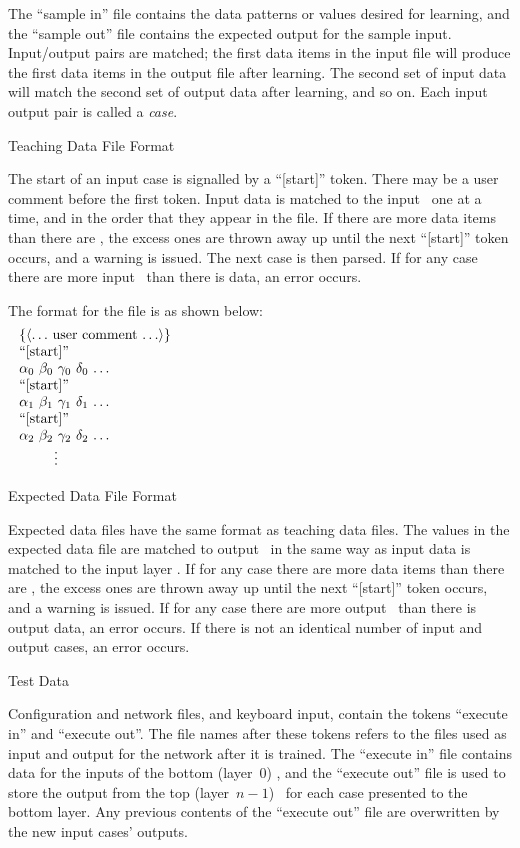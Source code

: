 The ``sample in'' file contains the data patterns or values desired
for learning, and the ``sample out'' file contains the expected
output for the sample input.
Input/output pairs are matched; the first data items in the input
file will produce the first data items in the output file after
learning.
The second set of input data will match the second set
of output data after learning, and so on.
Each input output pair is called a {\sl case}.

\sssec Teaching Data File Format

The start of an input case is signalled by a ``[start]'' token.
There may be a user comment before the first token.
Input data is matched to the input \neus\ one at a time, and in the
order that they appear in the file.
If there are more data items than there are \neus, the excess ones
are thrown away up until the next ``[start]'' token occurs, and a
warning is issued.
The next case is then parsed.
If for any case there are more input \neus\ than there is data, an
error occurs.

The format for the file is as shown below:
$$\vbox{
\halign{\hfil#\hfil&&\ \hfil#\hfil\cr
	\noalign{\noindent$\{\langle\ldots$ user comment $\ldots\rangle\}$}
	\noalign{\noindent``[start]''}
	$\alpha_0$&$\beta_0$&$\gamma_0$&$\delta_0$&$\ldots$\cr
	\noalign{\noindent``[start]''}
	$\alpha_1$&$\beta_1$&$\gamma_1$&$\delta_1$&$\ldots$\cr
	\noalign{\noindent``[start]''}
	$\alpha_2$&$\beta_2$&$\gamma_2$&$\delta_2$&$\ldots$\cr
	\noalign{\quad$\vdots$}
}}
$$

\sssec Expected Data File Format

Expected data files have the same format as teaching data files.
The values in the expected data file are matched to output \neus\ in
the same way as input data is matched to the input layer \neus.
If for any case there are more data items than there are \neus, the excess ones
are thrown away up until the next ``[start]'' token occurs, and a
warning is issued.
If for any case there are more output \neus\ than there is output
data, an error occurs.
If there is not an identical number of input and output cases, an
error occurs.

\ssec Test Data

Configuration and network files, and keyboard input, contain the
tokens ``execute in'' and ``execute out''.
The file names after these tokens refers to the files used as input
and output for the network after it is trained.
The ``execute in'' file contains data for the inputs of the bottom
(layer~$0$) \neus, and the ``execute out'' file is used to store
the output from the top (layer~$n-1$) \neus\ for each case presented to
the bottom layer.
Any previous contents of the ``execute out'' file are overwritten by
the new input cases' outputs.

